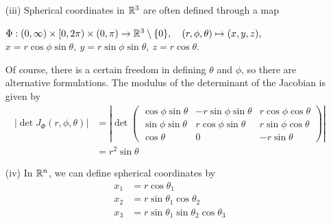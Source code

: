 \documentclass[12pt, t]{beamer}
\begin{document}
\begin{frame}[allowframebreaks]
\begin{itemize}
    \end{itemize}
    \newpage
    \begin{spacing}{1.2}
        \begin{itemize}
            \item[(iii)] Spherical coordinates in $\mathbb{R}^3$ are often defined through a map
                \begin{center}
                    $\Phi:(0,\infty)\times[0,2\pi)\times(0,\pi)\to\mathbb{R}^3\setminus\{0\},\quad
                        (r,\phi,\theta)\mapsto(x,y,z),$\\
                    $x=r\cos\phi\sin\theta,~y=r\sin\phi\sin\theta,~z=r\cos\theta$.
                \end{center}
                Of course, there is a certain freedom in defining $\theta$ and $\phi$, so there are
                alternative formulations. The modulus of the determinant of the
                Jacobian is given by
                \begin{equation*}
                    \begin{split}
                        |\det J_\Phi(r,\phi,\theta)| &=\left|\det\begin{pmatrix}
                            \cos\phi\sin\theta & -r\sin\phi\sin\theta & r\cos\phi\cos\theta \\
                            \sin\phi\sin\theta & r\cos\phi\sin\theta  & r\sin\phi\cos\theta \\
                            \cos\theta         & 0                    & -r\sin\theta
                        \end{pmatrix}\right| \\
                        &=r^2\sin\theta
                    \end{split}
                \end{equation*}
        \end{itemize}
    \end{spacing}
    \newpage
    \begin{itemize}
        \item[(iv)] In $\mathbb{R}^n$, we can define spherical coordinates by
            \begin{align*}
                x_1     & =r\cos\theta_1                                                   \\
                x_2     & =r\sin\theta_1\cos\theta_2                                       \\
                x_3     & =r\sin\theta_1\sin\theta_2\cos\theta_3                           \\

\end{align*}
\end{itemize}
\end{frame}
\end{document}
